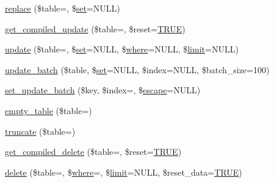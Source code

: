 \begin{DoxyCompactItemize}
\item 
\mbox{\hyperlink{class_c_i___d_b__query__builder_a9571a23501fb4dc9e724a06bcb78dc9a}{replace}} (\$table=\textquotesingle{}\textquotesingle{}, \$\mbox{\hyperlink{class_c_i___d_b__query__builder_a1589c46344f3a216a129cf65659b117c}{set}}=N\+U\+LL)
\item 
\mbox{\hyperlink{class_c_i___d_b__query__builder_a77fb150224714405067df7c300c317b0}{get\+\_\+compiled\+\_\+update}} (\$table=\textquotesingle{}\textquotesingle{}, \$reset=\mbox{\hyperlink{constants_8php_ae04a3efe6aa42044f803ee90c2277846}{T\+R\+UE}})
\item 
\mbox{\hyperlink{class_c_i___d_b__query__builder_a130a26da2dd4e4582ee18f42d71fe6e4}{update}} (\$table=\textquotesingle{}\textquotesingle{}, \$\mbox{\hyperlink{class_c_i___d_b__query__builder_a1589c46344f3a216a129cf65659b117c}{set}}=N\+U\+LL, \$\mbox{\hyperlink{class_c_i___d_b__query__builder_a2356c4b7b93fb83c62a354a8a0748222}{where}}=N\+U\+LL, \$\mbox{\hyperlink{class_c_i___d_b__query__builder_a875b0d4703f176c36e771d728a9a04a0}{limit}}=N\+U\+LL)
\item 
\mbox{\hyperlink{class_c_i___d_b__query__builder_a718928dc54d935761439538836f1e70d}{update\+\_\+batch}} (\$table, \$\mbox{\hyperlink{class_c_i___d_b__query__builder_a1589c46344f3a216a129cf65659b117c}{set}}=N\+U\+LL, \$index=N\+U\+LL, \$batch\+\_\+size=100)
\item 
\mbox{\hyperlink{class_c_i___d_b__query__builder_a7f212748fce6348224257ff09dec873a}{set\+\_\+update\+\_\+batch}} (\$key, \$index=\textquotesingle{}\textquotesingle{}, \$\mbox{\hyperlink{class_c_i___d_b__driver_ac8f37ca5703d4558c732e692194f8cd6}{escape}}=N\+U\+LL)
\item 
\mbox{\hyperlink{class_c_i___d_b__query__builder_af665fbf0b83f396d6c5529aca1f43517}{empty\+\_\+table}} (\$table=\textquotesingle{}\textquotesingle{})
\item 
\mbox{\hyperlink{class_c_i___d_b__query__builder_acaa636a6a61d4362c5a32941fc9932ba}{truncate}} (\$table=\textquotesingle{}\textquotesingle{})
\item 
\mbox{\hyperlink{class_c_i___d_b__query__builder_a3e2f8775363646e099009ff62b25a21a}{get\+\_\+compiled\+\_\+delete}} (\$table=\textquotesingle{}\textquotesingle{}, \$reset=\mbox{\hyperlink{constants_8php_ae04a3efe6aa42044f803ee90c2277846}{T\+R\+UE}})
\item 
\mbox{\hyperlink{class_c_i___d_b__query__builder_a482722b9989c53ed8ecd68b22df64507}{delete}} (\$table=\textquotesingle{}\textquotesingle{}, \$\mbox{\hyperlink{class_c_i___d_b__query__builder_a2356c4b7b93fb83c62a354a8a0748222}{where}}=\textquotesingle{}\textquotesingle{}, \$\mbox{\hyperlink{class_c_i___d_b__query__builder_a875b0d4703f176c36e771d728a9a04a0}{limit}}=N\+U\+LL, \$reset\+\_\+data=\mbox{\hyperlink{constants_8php_ae04a3efe6aa42044f803ee90c2277846}{T\+R\+UE}})

\end{DoxyCompactItemize}
